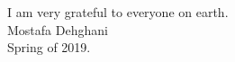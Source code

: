 \acknowledgments

I am very grateful to everyone on earth.\\[2ex]				
\hfill Mostafa Dehghani\\
Spring of 2019.

